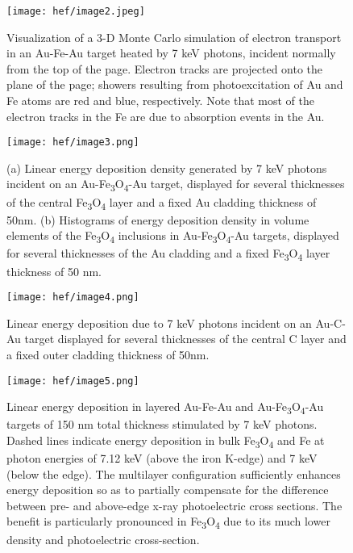 \begin{figure}[h]
\caption{
Visualization of a 3-D Monte Carlo simulation of
electron transport in an Au-Fe-Au target heated by 7 keV photons,
incident normally from the top of the page. Electron tracks are
projected onto the plane of the page; showers resulting from
photoexcitation of Au and Fe atoms are red and blue, respectively. Note
that most of the electron tracks in the Fe are due to absorption events
in the Au.
}
\label{fig:hef_image2}
\centering
\texttt{[image: hef/image2.jpeg]}
\end{figure}

\begin{figure}[h]
\caption{
(a) Linear energy deposition density generated by 7 keV
photons incident on an Au-Fe\textsubscript{3}O\textsubscript{4}-Au
target, displayed for several thicknesses of the central
Fe\textsubscript{3}O\textsubscript{4} layer and a fixed Au cladding
thickness of 50nm. (b) Histograms of energy deposition density in volume
elements of the Fe\textsubscript{3}O\textsubscript{4} inclusions in
Au-Fe\textsubscript{3}O\textsubscript{4}-Au targets, displayed for
several thicknesses of the Au cladding and a fixed
Fe\textsubscript{3}O\textsubscript{4} layer thickness of 50 nm.
}
\label{fig:hef_image3}
\centering
\texttt{[image: hef/image3.png]}
\end{figure}


\begin{figure}[h]
\caption{
Linear energy deposition due to 7 keV photons incident on an Au-C-Au
target displayed for several thicknesses of the central C layer and a
fixed outer cladding thickness of 50nm.
}
\label{fig:hef_image4}
\centering
\texttt{[image: hef/image4.png]}
\end{figure}

\begin{figure}[h]
\caption{
Linear energy deposition in layered Au-Fe-Au and
Au-Fe\textsubscript{3}O\textsubscript{4}-Au targets of 150 nm total
thickness stimulated by 7 keV photons. Dashed lines indicate energy
deposition in bulk Fe\textsubscript{3}O\textsubscript{4} and Fe at
photon energies of 7.12 keV (above the iron K-edge) and 7 keV (below the
edge). The multilayer configuration sufficiently enhances energy
deposition so as to partially compensate for the difference between pre-
and above-edge x-ray photoelectric cross sections. The benefit is
particularly pronounced in Fe\textsubscript{3}O\textsubscript{4} due to
its much lower density and photoelectric cross-section.
}
\label{fig:hef_image5}
\centering
\texttt{[image: hef/image5.png]}
\end{figure}

